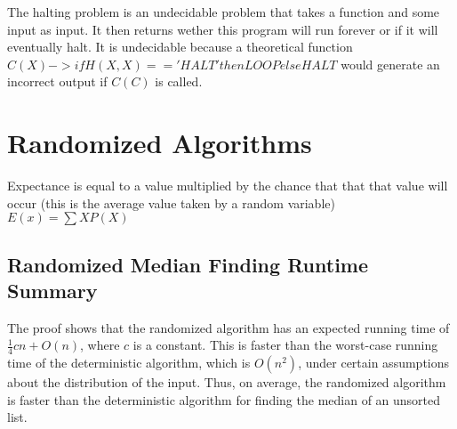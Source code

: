 \documentclass{article}
\begin{document}
The halting problem is an undecidable problem that takes a function and some input as input. It then returns
wether this program will run forever or if it will eventually halt. It is undecidable because a theoretical
function $C(X) -> if H(X,X) == 'HALT' then LOOP else HALT$ would generate an incorrect output if $C(C)$ is called.


\section{Randomized Algorithms}
Expectance is equal to a value multiplied by the chance that that that value will occur
(this is the average value taken by a random variable)$E(x) = \sum XP(X)$


\subsection{Randomized Median Finding Runtime Summary}
The proof shows that the randomized algorithm has an expected running time of $\frac{1}{4}cn + O(n)$, where $c$ is a constant. This is faster than the worst-case running time of the deterministic algorithm, which is $O(n^2)$, under certain assumptions about the distribution of the input. Thus, on average, the randomized algorithm is faster than the deterministic algorithm for finding the median of an unsorted list.
\end{document}
